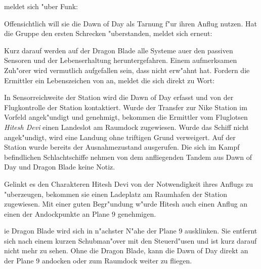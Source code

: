 \xl{} meldet sich "uber Funk:


Offensichtlich will sie die Dawn of Day als Tarnung f"ur ihren Anflug nutzen. Hat die Gruppe den ersten Schrecken "uberstanden, meldet sich \xl{} erneut:


Kurz darauf werden auf der Dragon Blade alle Systeme au\3er den passiven Sensoren und der Lebenserhaltung heruntergefahren. Einem aufmerksamen Zuh"orer wird vermutlich aufgefallen sein, dass \xl{} \ml{} nicht erw"ahnt hat. Fordern die Ermittler ein Lebenszeichen von \ml{} an, meldet die sich direkt zu Wort:


In Sensorreichweite der Station wird die Dawn of Day erfasst und von der Flugkontrolle der Station kontaktiert. Wurde der Transfer zur Nike Station im Vorfeld angek"undigt und genehmigt, bekommen die Ermittler vom Fluglotsen \emph{Hitesh Devi} einen Landeslot am Raumdock zugewiesen. Wurde das Schiff nicht angek"undigt, wird eine Landung ohne triftigen Grund verweigert. Auf der Station wurde bereits der Ausnahmezustand ausgerufen. Die sich im Kampf befindlichen Schlachtschiffe nehmen von dem anfliegenden Tandem aus Dawn of Day und Dragon Blade keine Notiz.

Gelinkt es den Charakteren Hitesh Devi von der Notwendigkeit ihres Anflugs zu "uberzeugen, bekommen sie einen Ladeplatz am Raumhafen der Station zugewiesen. Mit einer guten Begr"undung w"urde Hitesh auch einen Anflug an einen der Andockpunkte an Plane 9 genehmigen.

ie Dragon Blade wird sich in n"achster N"ahe der Plane 9 ausklinken. Sie entfernt sich nach einem kurzen Schubman"over mit den Steuerd"usen und ist kurz darauf nicht mehr zu sehen.  Ohne die Dragon Blade, kann die Dawn of Day direkt an der Plane 9 andocken oder zum Raumdock weiter zu fliegen.

